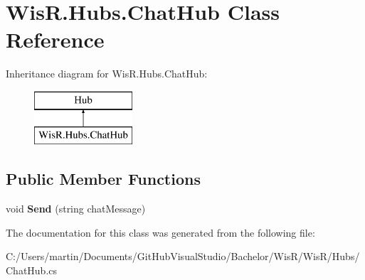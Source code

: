 \hypertarget{class_wis_r_1_1_hubs_1_1_chat_hub}{}\section{Wis\+R.\+Hubs.\+Chat\+Hub Class Reference}
\label{class_wis_r_1_1_hubs_1_1_chat_hub}
Inheritance diagram for Wis\+R.\+Hubs.\+Chat\+Hub\+:\begin{figure}[H]
\begin{center}
\leavevmode
\includegraphics[height=2.000000cm]{class_wis_r_1_1_hubs_1_1_chat_hub}
\end{center}
\end{figure}
\subsection*{Public Member Functions}
\begin{DoxyCompactItemize}
\item 
\hypertarget{class_wis_r_1_1_hubs_1_1_chat_hub_a37adf69a34901c4b698fe098b9ce27e8}{}void {\bfseries Send} (string chat\+Message)\label{class_wis_r_1_1_hubs_1_1_chat_hub_a37adf69a34901c4b698fe098b9ce27e8}

\end{DoxyCompactItemize}


The documentation for this class was generated from the following file\+:\begin{DoxyCompactItemize}
\item 
C\+:/\+Users/martin/\+Documents/\+Git\+Hub\+Visual\+Studio/\+Bachelor/\+Wis\+R/\+Wis\+R/\+Hubs/Chat\+Hub.\+cs\end{DoxyCompactItemize}
